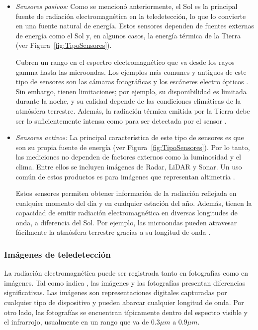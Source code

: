 \begin{itemize}
    \item \textit{Sensores pasivos:} Como se mencionó anteriormente, el Sol es la principal fuente de radiación electromagnética en la teledetección, lo que lo convierte en una fuente natural de energía. Estos sensores dependen de fuentes externas de energía como el Sol y, en algunos casos, la energía térmica de la Tierra (ver Figura~\ref{fig:TipoSensores}).

          Cubren un rango en el espectro electromagnético que va desde los rayos gamma hasta las microondas. Los ejemplos más comunes y antiguos de este tipo de sensores son las cámaras fotográficas y los escáneres electro ópticos \cite{tempfli2009principles, chuvieco2016fundamentals}. Sin embargo, tienen limitaciones; por ejemplo, su disponibilidad es limitada durante la noche, y su calidad depende de las condiciones climáticas de la atmósfera terrestre. Además, la radiación térmica emitida por la Tierra debe ser lo suficientemente intensa como para ser detectada por el sensor \cite{canada2007fundamentals}.

    \item \textit{Sensores activos:} La principal característica de este tipo de sensores es que son su propia fuente de energía (ver Figura~\ref{fig:TipoSensores}). Por lo tanto, las mediciones no dependen de factores externos como la luminosidad y el clima. Entre ellos se incluyen imágenes de Radar, LiDAR y Sonar. Un uso común de estos productos es para imágenes que representan altimetría \cite{tempfli2009principles, chuvieco2016fundamentals}.

          Estos sensores permiten obtener información de la radiación reflejada en cualquier momento del día y en cualquier estación del año. Además, tienen la capacidad de emitir radiación electromagnética en diversas longitudes de onda, a diferencia del Sol. Por ejemplo, las microondas pueden atravesar fácilmente la atmósfera terrestre gracias a su longitud de onda \cite{canada2007fundamentals}.
\end{itemize}

\subsubsection{Imágenes de teledetección}

La radiación electromagnética puede ser registrada tanto en fotografías como en imágenes. Tal como indica , las imágenes y las fotografías presentan diferencias significativas. Las imágenes son representaciones digitales capturadas por cualquier tipo de dispositivo y pueden abarcar cualquier longitud de onda. Por otro lado, las fotografías se encuentran típicamente dentro del espectro visible y el infrarrojo, usualmente en un rango que va de $0.3 \mu m$ a $0.9 \mu m$.


